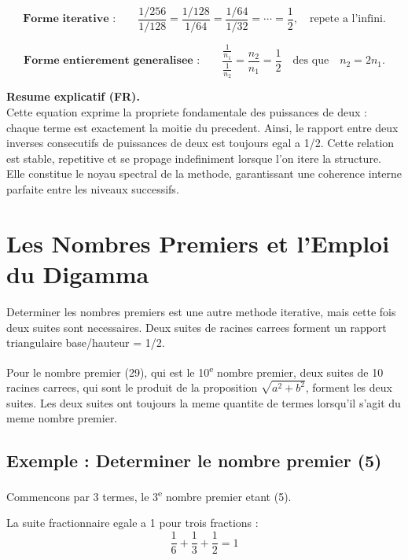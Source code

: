 \documentclass[a4paper,11pt]{article}
\newenvironment{mydef}[1]{%
    \begin{tcolorbox}[colback=blue!5,colframe=holblue,title={\textbf{Définition : #1}}]
}{%
    \end{tcolorbox}
}
\begin{document}
\[
\textbf{Forme iterative :}\qquad
\frac{1/256}{1/128}
=
\frac{1/128}{1/64}
=
\frac{1/64}{1/32}
=
\cdots
=
\frac{1}{2},
\quad
\text{repete a l'infini.}
\]

\[
\textbf{Forme entierement generalisee :}\qquad
\frac{\displaystyle \frac{1}{n_1}}{\displaystyle \frac{1}{n_2}}
=
\frac{n_2}{n_1}
=
\frac{1}{2}
\quad\text{des que}\quad
n_2 = 2n_1.
\]

\textbf{Resume explicatif (FR).} \\
Cette equation exprime la propriete fondamentale des puissances de deux : chaque terme
est exactement la moitie du precedent. Ainsi, le rapport entre deux inverses consecutifs
de puissances de deux est toujours egal a 1/2. Cette relation est stable, repetitive
et se propage indefiniment lorsque l'on itere la structure. Elle constitue le noyau
spectral de la methode, garantissant une coherence interne parfaite entre les niveaux
successifs.

\newpage
\section{Les Nombres Premiers et l'Emploi du Digamma}

Determiner les nombres premiers est une autre methode iterative, mais cette fois deux suites sont necessaires. Deux suites de racines carrees forment un rapport triangulaire base/hauteur = 1/2.

\begin{mydef}{Suites pour les nombres premiers}
Pour le nombre premier (29), qui est le 10\textsuperscript{e} nombre premier, deux suites de 10 racines carrees, qui sont le produit de la proposition $\sqrt{a^2 + b^2}$, forment les deux suites. Les deux suites ont toujours la meme quantite de termes lorsqu'il s'agit du meme nombre premier.
\end{mydef}

\subsection{Exemple : Determiner le nombre premier (5)}

Commencons par 3 termes, le 3\textsuperscript{e} nombre premier etant (5).

La suite fractionnaire egale a 1 pour trois fractions :
\[
\frac{1}{6} + \frac{1}{3} + \frac{1}{2} = 1
\]
\end{document}
